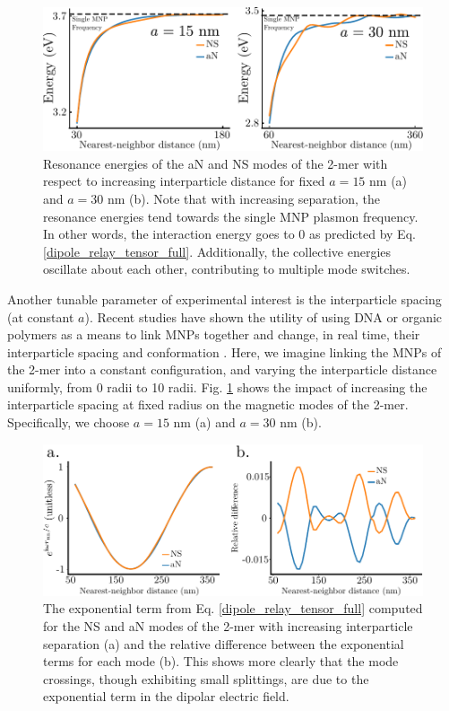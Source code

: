 \documentclass [11pt, proquest] {uwthesis}[2016/11/22]
\begin{document}
\begin{figure}
\begin{centering}
\includegraphics{spacing_2mer.pdf}
\caption{Resonance energies of the aN and NS modes of the 2-mer with respect to increasing interparticle distance for fixed $a=15$ nm (a) and $a=30$ nm (b). Note that with increasing separation, the resonance energies tend towards the single MNP plasmon frequency. In other words, the interaction energy goes to 0 as predicted by Eq. \ref{dipole_relay_tensor_full}. Additionally, the collective energies oscillate about each other, contributing to multiple mode switches.}
\label{spacing_eig}
\end{centering}
\end{figure}


Another tunable parameter of experimental interest is the interparticle spacing (at constant $a$). Recent studies have shown the utility of using DNA or organic polymers as a means to link MNPs together and change, in real time, their interparticle spacing and conformation \cite{DanLuo2009,NaLiu2017,Ginger2017}. Here, we imagine linking the MNPs of the 2-mer into a constant configuration, and varying the interparticle distance uniformly, from 0 radii to 10 radii. Fig. \ref{spacing_eig} shows the impact of increasing the interparticle spacing at fixed radius on the magnetic modes of the 2-mer. Specifically, we choose $a=15$ nm (a) and $a=30$ nm (b).


\begin{figure}
\begin{centering}
\includegraphics{diff_avg_space.pdf}
\caption{The exponential term from Eq. \ref{dipole_relay_tensor_full} computed for the NS and aN modes of the 2-mer with increasing interparticle separation (a) and the relative difference between the exponential terms for each mode (b). This shows more clearly that the mode crossings, though exhibiting small splittings, are due to the exponential term in the dipolar electric field.}
\label{diff_avg_space}
\end{centering}
\end{figure}
\end{document}
